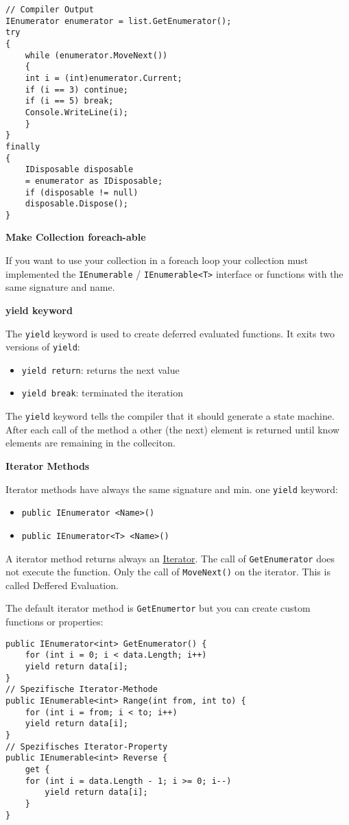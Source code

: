 \documentclass[11pt,twoside,landscape]{article}
\begin{document}
\begin{multicols}{3}
\lstset{language=csharp,label= ,caption= ,captionpos=b,numbers=none}
\begin{lstlisting}
// Compiler Output
IEnumerator enumerator = list.GetEnumerator();
try
{
    while (enumerator.MoveNext())
    {
	int i = (int)enumerator.Current;
	if (i == 3) continue;
	if (i == 5) break;
	Console.WriteLine(i);
    }
}
finally
{
    IDisposable disposable
	= enumerator as IDisposable;
    if (disposable != null)
	disposable.Dispose();
}
\end{lstlisting}

\textbf{Make Collection foreach-able}

If you want to use your collection in a foreach loop your collection must implemented the \texttt{IEnumerable} / \texttt{IEnumerable<T>} interface or functions with the same signature and name. 

\textbf{yield keyword}

The \texttt{yield} keyword is used to create deferred evaluated functions.
It exits two versions of \texttt{yield}:
\begin{itemize}
\item \texttt{yield return}: returns the next value
\item \texttt{yield break}: terminated the iteration
\end{itemize}


The \texttt{yield} keyword tells the compiler that it should generate a state machine.
After each call of the method a other (the next) element is returned until know elements are remaining in the colleciton.

\textbf{Iterator Methods}

Iterator methods have always the same signature and min. one \texttt{yield} keyword:
\begin{itemize}
\item \texttt{public IEnumerator <Name>()}
\item \texttt{public IEnumerator<T> <Name>()}
\end{itemize}


A iterator method returns always an \href{../../../roam/20211118154822-iterator.org}{Iterator}.
The call of \texttt{GetEnumerator} does not execute the function.
Only the call of \texttt{MoveNext()} on the iterator.
This is called Deffered Evaluation.

The default iterator method is \texttt{GetEnumertor} but you can create custom functions or properties:
\lstset{language=csharp,label= ,caption= ,captionpos=b,numbers=none}
\begin{lstlisting}
public IEnumerator<int> GetEnumerator() {
    for (int i = 0; i < data.Length; i++)
	yield return data[i];
}
// Spezifische Iterator-Methode
public IEnumerable<int> Range(int from, int to) {
    for (int i = from; i < to; i++)
	yield return data[i];
}
// Spezifisches Iterator-Property
public IEnumerable<int> Reverse {
    get {
	for (int i = data.Length - 1; i >= 0; i--)
	    yield return data[i];
    }
}
\end{lstlisting}



\end{multicols}
\end{document}
